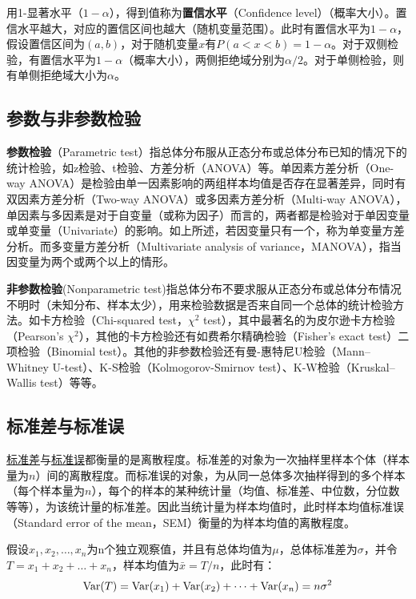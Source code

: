 \documentclass[11pt]{article}
\begin{document}
用1-显著水平（$1-\alpha$），得到值称为\textbf{置信水平}（Confidence level）（概率大小）。置信水平越大，对应的置信区间也越大（随机变量范围）。此时有置信水平为$1-\alpha$，假设置信区间为$(a,b)$，对于随机变量$x$有$P(a<x<b)=1-\alpha$。对于双侧检验，有置信水平为$1-\alpha$（概率大小），两侧拒绝域分别为$\alpha/2$。对于单侧检验，则有单侧拒绝域大小为$\alpha$。

\subsection{参数与非参数检验}

\textbf{参数检验}（Parametric test）指总体分布服从正态分布或总体分布已知的情况下的统计检验，如z检验、t检验、方差分析（ANOVA）等。单因素方差分析（One-way ANOVA）是检验由单一因素影响的两组样本均值是否存在显著差异，同时有双因素方差分析（Two-way ANOVA）或多因素方差分析（Multi-way ANOVA），单因素与多因素是对于自变量（或称为因子）而言的，两者都是检验对于单因变量或单变量（Univariate）的影响。如上所述，若因变量只有一个，称为单变量方差分析。而多变量方差分析（Multivariate analysis of variance，MANOVA），指当因变量为两个或两个以上的情形。

\textbf{非参数检验}(Nonparametric test)指总体分布不要求服从正态分布或总体分布情况不明时（未知分布、样本太少），用来检验数据是否来自同一个总体的统计检验方法。如卡方检验（Chi-squared test，$\chi^2$ test），其中最著名的为皮尔逊卡方检验（Pearson's $\chi^2$），其他的卡方检验还有如费希尔精确检验（Fisher's exact test）二项检验（Binomial test）。其他的非参数检验还有曼-惠特尼U检验（Mann–Whitney U-test）、K-S检验（Kolmogorov-Smirnov test）、K-W检验（Kruskal–Wallis test）等等。

\subsection{标准差与标准误}
    
\uline{标准差}与\uline{标准误}都衡量的是离散程度。标准差的对象为一次抽样里样本个体（样本量为$n$）间的离散程度。而标准误的对象，为从同一总体多次抽样得到的多个样本（每个样本量为$n$），每个的样本的某种统计量（均值、标准差、中位数，分位数等等），为该统计量的标准差。因此当统计量为样本均值时，此时样本均值标准误（Standard error of the mean，SEM）衡量的为样本均值的离散程度。
    
假设$x_1,x_2,\dots,x_n$为n个独立观察值，并且有总体均值为$\mu$，总体标准差为$\sigma$，并令$T = x_1 + x_2 + \dots + x_n$，样本均值为$\bar{x} = T/n$，此时有：
\begin{equation*}
    \operatorname{Var}(T) = \operatorname{Var}(x_1) + \operatorname{Var}(x_2) + \dots + \operatorname{Var}(x_n) = n \sigma^2
\end{equation*}
    
\end{document}
